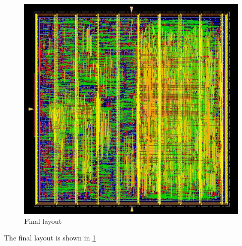 \begin{figure}[h!]
	\centering
	\includegraphics[width=\textwidth]{chapters/figures/9.Post_PostRouteOPT.jpg} 
	\caption{Final layout}
	\label{fig:final_design}  
	\end{figure}

The final layout is shown in \ref{fig:final_design}









